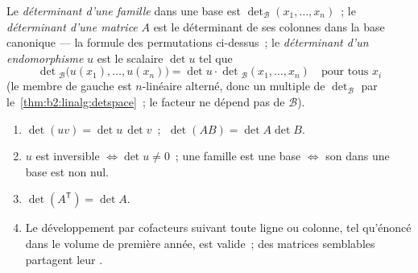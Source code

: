 \begin{definition}[Déterminants]\label{def:b2:linalg:det}
Le \emph{déterminant d'une famille} dans une base
est $\det_{\mathcal{B}}(x_1, \dots, x_n)$~; le \emph{déterminant d'une
matrice} $A$ est le déterminant de ses colonnes dans la base canonique
--- la formule des permutations ci-dessus~; le \emph{déterminant d'un
endomorphisme} $u$ est le scalaire $\det u$ tel que
\[
\det{}_{\mathcal{B}}\bigl(u(x_1), \dots, u(x_n)\bigr)
= \det u \cdot \det{}_{\mathcal{B}}(x_1, \dots, x_n)
\quad \text{pour tous } x_i
\]
(le membre de gauche est $n$-linéaire alterné, donc un multiple de
$\det_\mathcal{B}$ par le~\cref{thm:b2:linalg:detspace}~; le facteur ne
dépend pas de $\mathcal{B}$).
\end{definition}

\begin{theorem}\label{thm:b2:linalg:detrules}
\begin{enumerate}
  \item $\det(uv) = \det u\,\det v$~; $\;\det(AB) = \det A \det B$.
  \item $u$ est inversible $\iff \det u \neq 0$~; une famille est une
        base $\iff$ son  dans une base est non nul.
  \item $\det(A^{\mathsf T}) = \det A$.
  \item Le développement par cofacteurs suivant toute ligne ou colonne,
        tel qu'énoncé dans le volume de première année, est valide~;
        des matrices semblables partagent leur .
\end{enumerate}
\end{theorem}

